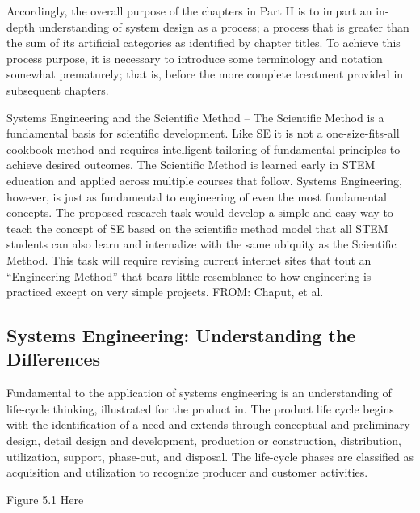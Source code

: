 Accordingly, the overall purpose of the chapters in Part II is to impart an in-depth understanding of system design as a process; a process that is greater than the sum of its artificial categories as identified by chapter titles. To achieve this process purpose, it is necessary to introduce some terminology and notation somewhat prematurely; that is, before the more complete treatment provided in subsequent chapters.

Systems Engineering and the Scientific Method – The Scientific Method is a fundamental basis for scientific development. Like SE it is not a one-size-fits-all cookbook method and requires intelligent tailoring of fundamental principles to achieve desired outcomes. The Scientific Method is learned early in STEM education and applied across multiple courses that follow. Systems Engineering, however, is just as fundamental to engineering of even the most fundamental concepts. The proposed research task would develop a simple and easy way to teach the concept of SE based on the scientific method model that all STEM students can also learn and internalize with the same ubiquity as the Scientific Method. This task will require revising current internet sites that tout an ``Engineering Method'' that bears little resemblance to how engineering is practiced except on very simple projects. FROM: Chaput, et al.

\subsection{Systems Engineering: Understanding the Differences}

Fundamental to the application of systems engineering is an understanding of life-cycle thinking, illustrated for the product in. The product life cycle begins with the identification of a need and extends through conceptual and preliminary design, detail design and development, production or construction, distribution, utilization, support, phase-out, and disposal. The life-cycle phases are classified as acquisition and utilization to recognize producer and customer activities.

Figure 5.1 Here

